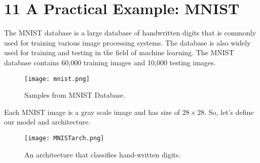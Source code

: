 \documentclass[11pt]{article}
\begin{document}
\section{11 A Practical Example: MNIST}
\hspace*{1cm}The MNIST database is a large database of handwritten digits that is commonly used for training various image processing systems. The database is also widely used for training and testing in the field of machine learning. The MNIST database contains 60,000 training images and 10,000 testing images.
\begin{figure}[H]
\centering
\texttt{[image: mnist.png]}
\caption{Samples from MNIST Database.}
\label{fig:figure3}
\end{figure}
Each MNIST image is a gray scale image and has size of $28 \times 28$. So, let's define our model and architecture.
\begin{figure}[H]
\centering
\texttt{[image: MNISTarch.png]}
\caption{An architecture that classifies hand-written digits.}
\label{fig:figure3}
\end{figure}
\end{document}
